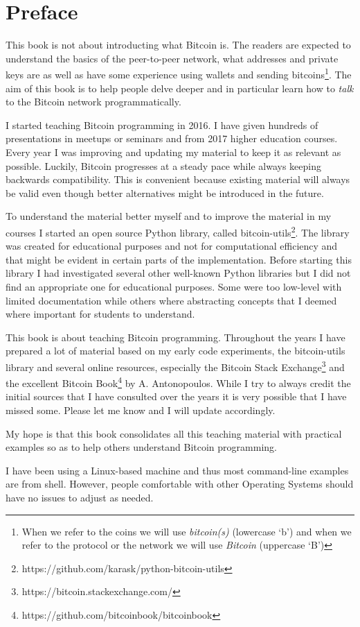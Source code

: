 
\section{Preface}
This book is not about introducting what Bitcoin is. The readers are expected to understand the basics of the peer-to-peer network, what addresses and private keys are as well as have some experience using wallets and sending bitcoins\footnote{When we refer to the coins we will use \emph{bitcoin(s)} (lowercase `b') and when we refer to the protocol or the network we will use \emph{Bitcoin} (uppercase `B')}. The aim of this book is to help people delve deeper and in particular learn how to \emph{talk} to the Bitcoin network programmatically.

I started teaching Bitcoin programming in 2016. I have given hundreds of presentations in meetups or seminars and from 2017 higher education courses. Every year I was improving and updating my material to keep it as relevant as possible. Luckily, Bitcoin progresses at a steady pace while always keeping backwards compatibility. This is convenient because existing material will always be valid even though better alternatives might be introduced in the future.
  
To understand the material better myself and to improve the material in my courses I started an open source Python library, called bitcoin-utils\footnote{https://github.com/karask/python-bitcoin-utils}. The library was created for educational purposes and not for computational efficiency and that might be evident in certain parts of the implementation. Before starting this library I had investigated several other well-known Python libraries but I did not find an appropriate one for educational purposes. Some were too low-level with limited documentation while others where abstracting concepts that I deemed where important for students to understand.

This book is about teaching Bitcoin programming. Throughout the years I have prepared a lot of material based on my early code experiments, the bitcoin-utils library and several online resources, especially the Bitcoin Stack Exchange\footnote{https://bitcoin.stackexchange.com/} and the excellent Bitcoin Book\footnote{https://github.com/bitcoinbook/bitcoinbook} by A. Antonopoulos. While I try to always credit the initial sources that I have consulted over the years it is very possible that I have missed some. Please let me know and I will update accordingly.

My hope is that this book consolidates all this teaching material with practical examples so as to help others understand Bitcoin programming. 

I have been using a Linux-based machine and thus most command-line examples are from  shell. However, people comfortable with other Operating Systems should have no issues to adjust as needed.
